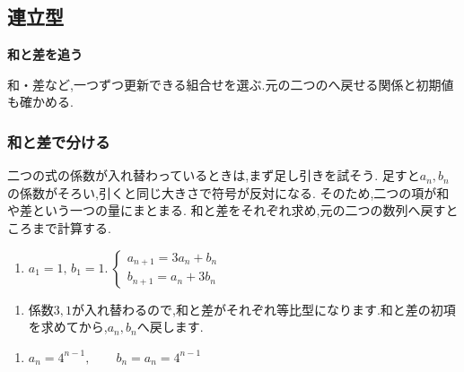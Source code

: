 
\subsection{連立型}\label{節：連立型}
\begin{bookpoint}
  \textbf{和と差を追う}\par
  和・差など,一つずつ更新できる組合せを選ぶ.元の二つのへ戻せる関係と初期値も確かめる.
\end{bookpoint}
\subsubsection{和と差で分ける}
二つの式の係数が入れ替わっているときは,まず足し引きを試そう.
足すと$a_n,b_n$の係数がそろい,引くと同じ大きさで符号が反対になる.
そのため,二つの項が和や差という一つの量にまとまる.
和と差をそれぞれ求め,元の二つの数列へ戻すところまで計算する.

\noindent {}\par\nobreak
\begin{enumerate}[label=(\arabic*),parsep=3pt,format=\bookitemlink{example-system-1}{problem}{answer}]
  \item $\displaystyle a_1=1,\,b_1=1.\ \begin{cases}a_{n+1}=3a_n+b_n\\ b_{n+1}=a_n+3b_n\end{cases}$
\end{enumerate}

\noindent {}\par\nobreak
\begin{enumerate}[label=(\arabic*),parsep=3pt,format=\bookitemlink{example-system-1}{hint}{problem}]
  \item 係数$3,1$が入れ替わるので,和と差がそれぞれ等比型になります.和と差の初項を求めてから,$a_n,b_n$へ戻します.
\end{enumerate}

\noindent {}\par\nobreak
\begin{enumerate}[label=(\arabic*),parsep=3pt,format=\bookitemlink{example-system-1}{answer}{problem}]
  \item $\displaystyle a_n=4^{n-1},\qquad b_n=a_n=4^{n-1}$
\end{enumerate}

